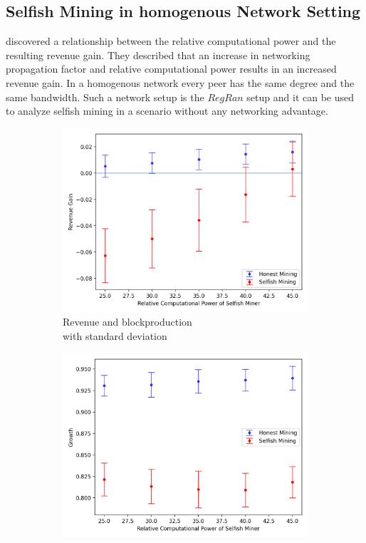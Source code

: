 \subsection{Selfish Mining in homogenous Network Setting}
 discovered a relationship between the relative computational power and the resulting revenue gain. They described that an increase in networking propagation factor and relative computational power results in an increased revenue gain. In a homogenous network every peer has the same degree and the same bandwidth. Such a network setup is the $RegRan$ setup and it can be used to analyze selfish mining in a scenario without any networking advantage.
\begin{figure}[h! t]
	 \begin{subfigure}[b]{0.48\textwidth}
		\includegraphics[width=\textwidth]{figures/rev_and_bpr_per_peer.png}
		\caption{Revenue and blockproduction\\ with standard deviation}
		\label{fig:multi_hr}
	\end{subfigure}
	\hfill
	\begin{subfigure}[b]{0.48\textwidth}
		\includegraphics[width=\textwidth]{figures/growth.png}

\end{subfigure}
\end{figure}

